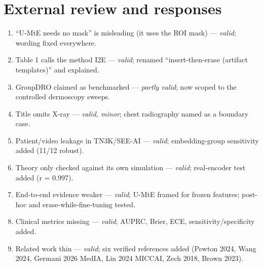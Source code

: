 \documentclass[10pt,a4paper]{article}
\begin{document}
\section{External review and responses}\label{sec:review}
\begin{enumerate}[leftmargin=*]\itemsep1pt
\item ``U-MtE needs no mask'' is misleading (it uses the ROI mask) --- \emph{valid}; wording fixed everywhere.
\item Table 1 calls the method I2E --- \emph{valid}; renamed ``insert-then-erase (artifact templates)'' and explained.
\item GroupDRO claimed as benchmarked --- \emph{partly valid}; now scoped to the controlled dermoscopy sweeps.
\item Title omits X-ray --- \emph{valid, minor}; chest radiography named as a boundary case.
\item Patient/video leakage in TN3K/SEE-AI --- \emph{valid}; embedding-group sensitivity added (11/12 robust).
\item Theory only checked against its own simulation --- \emph{valid}; real-encoder test added (r = 0.997).
\item End-to-end evidence weaker --- \emph{valid}; U-MtE framed for frozen features; post-hoc and erase-while-fine-tuning tested.
\item Clinical metrics missing --- \emph{valid}; AUPRC, Brier, ECE, sensitivity/specificity added.
\item Related work thin --- \emph{valid}; six verified references added (Pewton 2024, Wang 2024, Germani 2026 MedIA, Lin
2024 MICCAI, Zech 2018, Brown 2023).
\end{enumerate}
\end{document}
